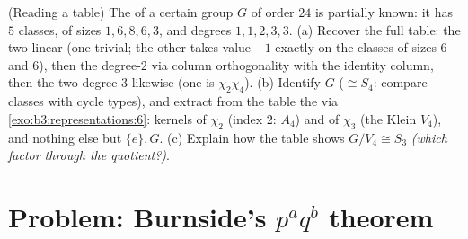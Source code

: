 \begin{exercise}[$\star\star$]\label{exo:b3:representations:12}
(Reading a table) The  of a certain group $G$
of order $24$ is partially known: it has $5$ classes, of
sizes $1, 6, 8, 6, 3$, and degrees $1, 1, 2, 3, 3$.
(a) Recover the full table: the two linear 
(one trivial; the other takes value $-1$ exactly on the
classes of sizes $6$ and $6$), then the degree-$2$ 
via column orthogonality with the identity column, then the
two degree-$3$  likewise (one is $\chi_2\chi_4$).
(b) Identify $G$ ($\cong S_4$: compare classes with cycle
types), and extract from the table the  via
\cref{exo:b3:representations:6}: kernels of $\chi_2$ (index
$2$: $A_4$) and of $\chi_3$ (the Klein $V_4$), and nothing
else but $\{e\}, G$.
(c) Explain how the table shows $G/V_4 \cong S_3$
\emph{(which  factor through the quotient?)}.
\end{exercise}

\section{Problem: Burnside's \texorpdfstring{$p^aq^b$}{paqb}
theorem}

